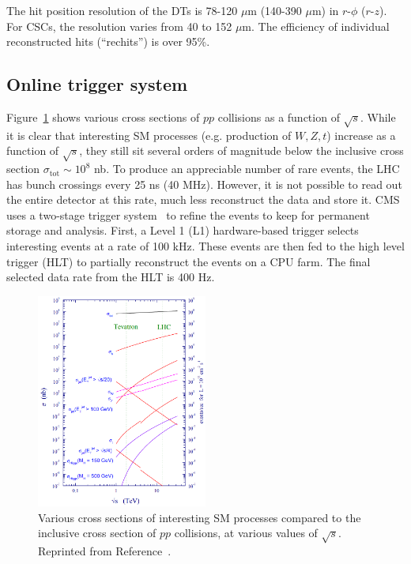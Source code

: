 The hit position resolution of the DTs is 78-120 $\mu$m (140-390 $\mu$m) in $r$-$\phi$ ($r$-$z$).
For CSCs, the resolution varies from 40 to 152 $\mu$m.
The efficiency of individual reconstructed hits (``rechits'') is over 95\%.

\subsection{Online trigger system}

Figure~\ref{fig:cms:xsecs} shows various cross sections of $pp$ collisions as a function of $\sqrt{s}$.
While it is clear that interesting SM processes (e.g. production of $W,Z,t$) increase as a function of $\sqrt{s}$, they still sit several orders of magnitude below the inclusive cross section $\sigma_\mathrm{tot}\sim 10^8$ nb.
To produce an appreciable number of rare events, the LHC has bunch crossings every 25 ns (40 MHz).
However, it is not possible to read out the entire detector at this rate, much less reconstruct the data and store it.
CMS uses a two-stage trigger system~\cite{cmstrig} to refine the events to keep for permanent storage and analysis.
First, a Level 1 (L1) hardware-based trigger selects interesting events at a rate of 100 kHz.
These events are then fed to the high level trigger (HLT) to partially reconstruct the events on a CPU farm.
The final selected data rate from the HLT is 400 Hz.

\begin{figure}[]
\begin{center}
	\includegraphics[width=0.5\textwidth,angle=90]{figures/cms/xsec.png}
	\caption{Various cross sections of interesting SM processes compared to the inclusive cross section of $pp$ collisions, at various values of $\sqrt{s}$.
				Reprinted from Reference~\cite{lhcxsec}.}
	\label{fig:cms:xsecs}
\end{center}
\end{figure}

